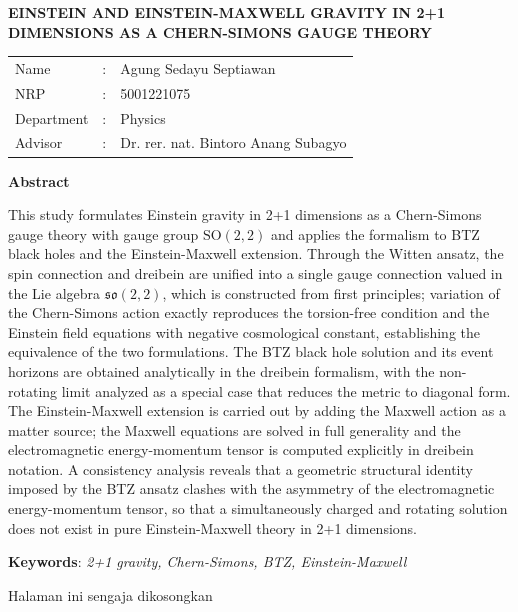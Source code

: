 \begin{center}
	\large{\textbf{EINSTEIN AND EINSTEIN-MAXWELL GRAVITY IN 2+1 DIMENSIONS AS A CHERN-SIMONS GAUGE THEORY}}
\end{center}

\vspace{1em}

\noindent
\begin{tabular}{@{}lcl@{}}
	Name       & : & Agung Sedayu Septiawan \\
	NRP        & : & 5001221075 \\
	Department & : & Physics \\
	Advisor    & : & Dr. rer. nat. Bintoro Anang Subagyo \\
\end{tabular}

\vspace{1em}

\noindent\textbf{Abstract}

\par This study formulates Einstein gravity in 2+1 dimensions as a Chern-Simons gauge theory with gauge group $\mathrm{SO}(2,2)$ and applies the formalism to BTZ black holes and the Einstein-Maxwell extension. Through the Witten ansatz, the spin connection and dreibein are unified into a single gauge connection valued in the Lie algebra $\mathfrak{so}(2,2)$, which is constructed from first principles; variation of the Chern-Simons action exactly reproduces the torsion-free condition and the Einstein field equations with negative cosmological constant, establishing the equivalence of the two formulations. The BTZ black hole solution and its event horizons are obtained analytically in the dreibein formalism, with the non-rotating limit analyzed as a special case that reduces the metric to diagonal form. The Einstein-Maxwell extension is carried out by adding the Maxwell action as a matter source; the Maxwell equations are solved in full generality and the electromagnetic energy-momentum tensor is computed explicitly in dreibein notation. A consistency analysis reveals that a geometric structural identity imposed by the BTZ ansatz clashes with the asymmetry of the electromagnetic energy-momentum tensor, so that a simultaneously charged and rotating solution does not exist in pure Einstein-Maxwell theory in 2+1 dimensions.

\vspace{1em}

\noindent\textbf{Keywords}: \textit{2+1 gravity, Chern-Simons, BTZ, Einstein-Maxwell}

\newpage
\thispagestyle{empty}
\vspace*{\fill}
    \begin{center}
	Halaman ini sengaja dikosongkan
    \end{center}
\vspace*{\fill}
\pagebreak
